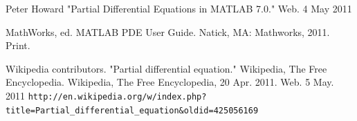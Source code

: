 \documentclass{amsart}
\theoremstyle{definition}
\begin{document}
\begin{thebibliography}{9}
   Peter Howard
   "Partial Differential Equations in MATLAB 7.0."
   Web.
   4 May 2011

   MathWorks, ed.
   MATLAB PDE User Guide.
   Natick, MA:
   Mathworks, 2011.
   Print.

   Wikipedia contributors.
   "Partial differential equation."
   Wikipedia, The Free Encyclopedia.
   Wikipedia, The Free Encyclopedia, 20 Apr. 2011.
   Web.
   5 May. 2011
   \verb+http://en.wikipedia.org/w/index.php?title=Partial_differential_equation&oldid=425056169+
\end{thebibliography}
\end{document}

